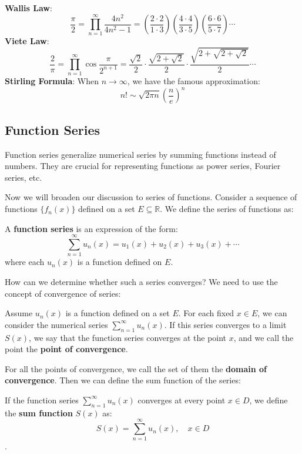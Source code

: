 \textbf{Wallis Law}:
\[\frac{\pi}{2} = \prod_{n=1}^{\infty} \frac{4n^2}{4n^2 - 1} = \left(\frac{2 \cdot 2}{1 \cdot 3}\right) \left(\frac{4 \cdot 4}{3 \cdot 5}\right) \left(\frac{6 \cdot 6}{5 \cdot 7}\right) \cdots\]
\textbf{Viete Law}:
\[\frac{2}{\pi} = \prod_{n=1}^{\infty} \cos \frac{\pi}{2^{n+1}} = \frac{\sqrt{2}}{2} \cdot \frac{\sqrt{2 + \sqrt{2}}}{2} \cdot \frac{\sqrt{2 + \sqrt{2 + \sqrt{2}}}}{2} \cdots\]
\textbf{Stirling Formula}:
When $n \to \infty$, we have the famous approximation:
\[n! \sim \sqrt{2\pi n}\left(\frac{n}{e}\right)^n\]

\newpage

\subsection{Function Series}

Function series generalize numerical series by summing functions instead of numbers. They are crucial for representing functions as power series, Fourier series, etc.

Now we will broaden our discussion to series of functions. Consider a sequence of functions $\{f_n(x)\}$ defined on a set $E \subseteq \mathbb{R}$. We define the series of functions as:

\begin{definition}
A \textbf{function series} is an expression of the form:
\[ \sum_{n=1}^{\infty} u_n(x) = u_1(x) + u_2(x) + u_3(x) + \cdots \]
where each $u_n(x)$ is a function defined on $E$.
\end{definition}

How can we determine whether such a series converges? We need to use the concept of convergence of series:

\begin{definition}
    Assume $u_n(x)$ is a function defined on a set $E$. For each fixed $x \in E$, we can consider the numerical series $\sum_{n=1}^{\infty} u_n(x)$. If this series converges to a limit $S(x)$, we say that the function series converges at the point $x$, and we call the point the \textbf{point of convergence}.
\end{definition}

For all the points of convergence, we call the set of them the \textbf{domain of convergence}. Then we can define the sum function of the series:

\begin{definition}
If the function series $\sum_{n=1}^{\infty} u_n(x)$ converges at every point $x \in D$, we define the \textbf{sum function} $S(x)$ as:
\[ S(x) = \sum_{n=1}^{\infty} u_n(x), \quad x \in D \].
\end{definition}

